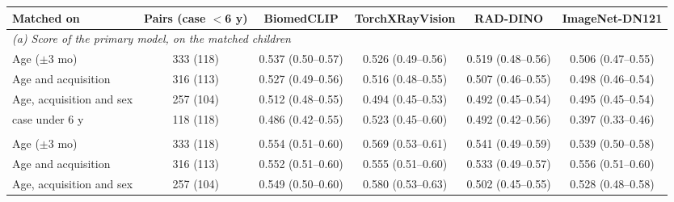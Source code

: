 \begin{tabular}{lccccc}
\toprule
Matched on & Pairs (case $<$6 y) & BiomedCLIP & TorchXRayVision & RAD-DINO & ImageNet-DN121 \\
\midrule
\multicolumn{6}{l}{\emph{(a) Score of the primary model, on the matched children}} \\
Age ($\pm$3 mo) & 333 (118) & 0.537 (0.50--0.57) & 0.526 (0.49--0.56) & 0.519 (0.48--0.56) & 0.506 (0.47--0.55) \\
Age and acquisition & 316 (113) & 0.527 (0.49--0.56) & 0.516 (0.48--0.55) & 0.507 (0.46--0.55) & 0.498 (0.46--0.54) \\
Age, acquisition and sex & 257 (104) & 0.512 (0.48--0.55) & 0.494 (0.45--0.53) & 0.492 (0.45--0.54) & 0.495 (0.45--0.54) \\
\quad case under 6 y & 118 (118) & 0.486 (0.42--0.55) & 0.523 (0.45--0.60) & 0.492 (0.42--0.56) & 0.397 (0.33--0.46) \\
\addlinespace
\multicolumn{6}{l}{\emph{(b) Probe retrained inside the matched set, folds by pair}} \\
Age ($\pm$3 mo) & 333 (118) & 0.554 (0.51--0.60) & 0.569 (0.53--0.61) & 0.541 (0.49--0.59) & 0.539 (0.50--0.58) \\
Age and acquisition & 316 (113) & 0.552 (0.51--0.60) & 0.555 (0.51--0.60) & 0.533 (0.49--0.57) & 0.556 (0.51--0.60) \\
Age, acquisition and sex & 257 (104) & 0.549 (0.50--0.60) & 0.580 (0.53--0.63) & 0.502 (0.45--0.55) & 0.528 (0.48--0.58) \\
\bottomrule
\end{tabular}
